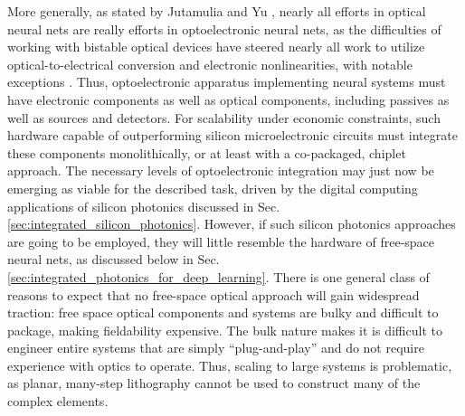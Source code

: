 More generally, as stated by Jutamulia and Yu \cite{juya1996}, nearly all efforts in optical neural nets are really efforts in optoelectronic neural nets, as the difficulties of working with bistable optical devices \cite{ke1985} have steered nearly all work to utilize optical-to-electrical conversion and electronic nonlinearities, with notable exceptions \cite{prsh2017}. Thus, optoelectronic apparatus implementing neural systems must have electronic components as well as optical components, including passives as well as sources and detectors. For scalability under economic constraints, such hardware capable of outperforming silicon microelectronic circuits must integrate these components monolithically, or at least with a co-packaged, chiplet approach. The necessary levels of optoelectronic integration may just now be emerging as viable for the described task, driven by the digital computing applications of silicon photonics discussed in Sec.\,\ref{sec:integrated_silicon_photonics}. However, if such silicon photonics approaches are going to be employed, they will little resemble the hardware of free-space neural nets, as discussed below in Sec.\,\ref{sec:integrated_photonics_for_deep_learning}. There is one general class of reasons to expect that no free-space optical approach will gain widespread traction: free space optical components and systems are bulky and difficult to package, making fieldability expensive. The bulk nature makes it is difficult to engineer entire systems that are simply ``plug-and-play'' and do not require experience with optics to operate. Thus, scaling to large systems is problematic, as planar, many-step lithography cannot be used to construct many of the complex elements.

